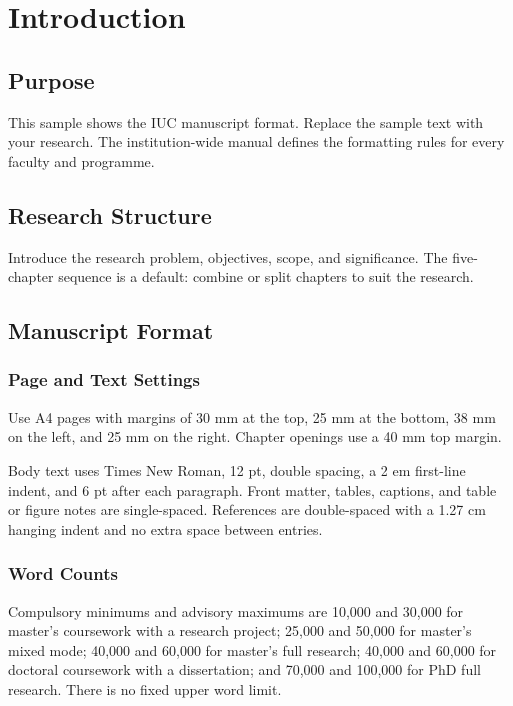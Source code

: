 \chapter{Introduction}

\section{Purpose}

This sample shows the IUC manuscript format. Replace the sample text with your
research. The institution-wide manual defines the formatting rules for every
faculty and programme.

\section{Research Structure}

Introduce the research problem, objectives, scope, and significance. The
five-chapter sequence is a default: combine or split chapters to suit the
research.

\section{Manuscript Format}

\subsection{Page and Text Settings}

Use A4 pages with margins of 30 mm at the top, 25 mm at the bottom, 38 mm on
the left, and 25 mm on the right. Chapter openings use a 40 mm top margin.

Body text uses Times New Roman, 12 pt, double spacing, a 2 em first-line
indent, and 6 pt after each paragraph. Front matter, tables, captions, and
table or figure notes are single-spaced. References are double-spaced with a
1.27 cm hanging indent and no extra space between entries.

\subsection{Word Counts}

Compulsory minimums and advisory maximums are 10,000 and 30,000 for master's
coursework with a research project; 25,000 and 50,000 for master's mixed mode;
40,000 and 60,000 for master's full research; 40,000 and 60,000 for doctoral
coursework with a dissertation; and 70,000 and 100,000 for PhD full research.
There is no fixed upper word limit.

